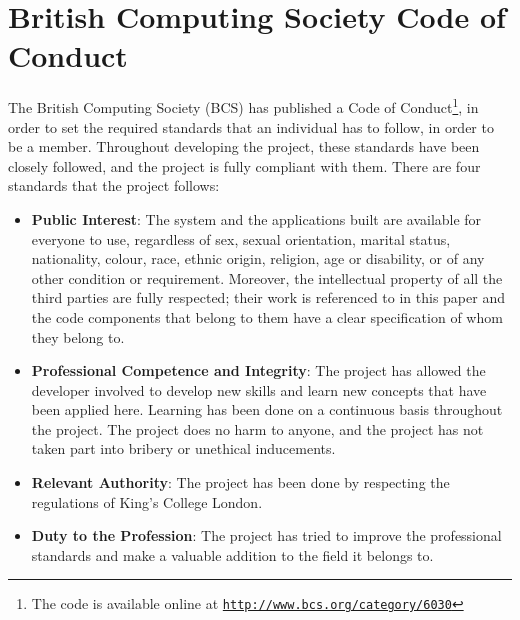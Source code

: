 \section{British Computing Society Code of Conduct}
The British Computing Society (BCS) has published a Code of Conduct\footnote{The code is available online at \texttt{\url{http://www.bcs.org/category/6030}}}, in order to set the required standards that an individual has to follow, in order to be a member. Throughout developing the project, these standards have been closely followed, and the project is fully compliant with them. There are four standards that the project follows:
\begin{itemize}
    \item \textbf{Public Interest}: The system and the applications built are available for everyone to use, regardless of sex, sexual orientation, marital status, nationality, colour, race, ethnic origin, religion, age or disability, or of any other condition or requirement. Moreover, the intellectual property of all the third parties are fully respected; their work is referenced to in this paper and the code components that belong to them have a clear specification of whom they belong to.
    \item \textbf{Professional Competence and Integrity}: The project has allowed the developer involved to develop new skills and learn new concepts that have been applied here. Learning has been done on a continuous basis throughout the project. The project does no harm to anyone, and the project has not taken part into bribery or unethical inducements.
    \item \textbf{Relevant Authority}: The project has been done by respecting the regulations of King's College London.
    \item \textbf{Duty to the Profession}: The project has tried to improve the professional standards and make a valuable addition to the field it belongs to.
\end{itemize}

